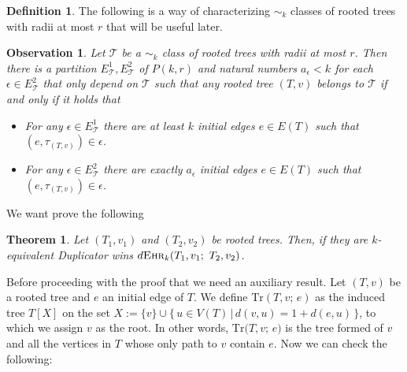 \documentclass[12pt,notitlepage,a4paper]{article}
\newtheorem{theorem}{Theorem}[section]
\newtheorem{obs}{Observation}[section]
\theoremstyle{definition}
\newtheorem{definition}{Definition}[section]
\newcommand{\ehr}{\textsc{Ehr}}
\begin{document}
\begin{definition}
The following is a way of characterizing $\sim_k$ classes
of rooted trees with radii at most $r$ that will be useful later. 

\begin{obs}\label{obs:equivalenttrees}
Let $\mathcal{T}$ be a $\sim_k$ class of rooted trees with
radii at most $r$. Then there is a partition $E^1_\mathcal{T},
E^2_\mathcal{T}$ of $P(k,r)$ and natural numbers $a_\epsilon<k$
for each $\epsilon\in E^2_\mathcal{T}$ that only depend on 
$\mathcal{T}$ such that any rooted tree $(T,v)$ belongs to
$\mathcal{T}$ if and only if it holds that
\begin{itemize}
	\item[(1)] For any $\epsilon\in E^1_\mathcal{T}$ there are at least
	$k$ initial edges $e\in E(T)$ such that
	$(e,\tau_{(T,v)})\in \epsilon$.
	\item[(2)] For any $\epsilon\in E^2_\mathcal{T}$ there are exactly
	$a_\epsilon$ initial edges $e\in E(T)$ such that
	$(e,\tau_{(T,v)})\in \epsilon$.	
\end{itemize}
\end{obs}


\end{definition}
We want prove the following
\begin{theorem} \label{thm:equivalenttrees} 
	Let $(T_1,v_1)$ and $(T_2,v_2)$ be rooted trees.
	Then, if they are $k$-equivalent Duplicator wins
	$d\ehr_{k}(T_1,v_1;\, \, T_2,v_2)$.
\end{theorem}

Before proceeding with the proof that we need an auxiliary
result. Let $(T,v)$ be a rooted tree and $e$ an 
initial edge of $T$. We define $\mathrm{Tr}(T,v;\, e)$ as
the induced tree $T[X]$ on the set
$X:=\{v\} \cup \{\, u\in V(T) \, | \, d(v,u) = 1 + d(e,u) \,\}$,
to which we assign $v$ as the root. In other words, 
$\mathrm{Tr}\big(T,v;\, e\big)$ is the tree formed of 
$v$ and all the vertices
in $T$ whose only path to $v$ contain $e$. 
Now we can check the following:
\end{document}
